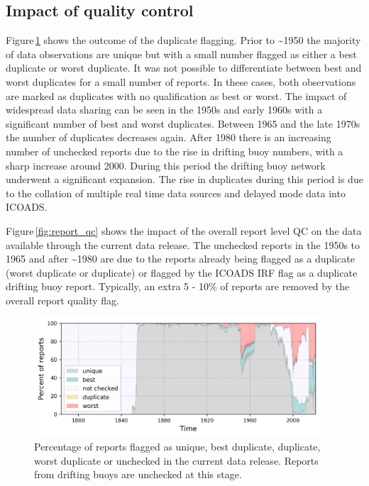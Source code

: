 \subsection{Impact of quality control}
Figure\,\ref{fig:dup_status} shows the outcome of the duplicate flagging. 
Prior to \sim 1950 the majority of data observations are unique but with a small number flagged as either a best duplicate or worst duplicate.
It was not possible to differentiate between best and worst duplicates for a small number of reports. 
In these cases, both observations are marked as duplicates with no qualification as best or worst.
The impact of widespread data sharing can be seen in the 1950s and early 1960s with a significant number of best and worst duplicates. 
Between 1965 and the late 1970s the number of duplicates decreases again.
After 1980 there is an increasing number of unchecked reports due to the rise in drifting buoy numbers, with a sharp increase around 2000.
During this period the drifting buoy network underwent a significant expansion.
The rise in duplicates during this period is due to the collation of multiple real time data sources and delayed mode data into ICOADS.

Figure\,\ref{fig:report_qc} shows the impact of the overall report level QC on the data available through the current data release. 
The unchecked reports in the 1950s to 1965 and after \sim 1980 are due to the reports already being flagged as a duplicate (worst duplicate or duplicate) or flagged by the ICOADS IRF flag as a duplicate drifting buoy report.
Typically, an extra 5 - 10\% of reports are removed by the overall report quality flag.

\FloatBarrier

\begin{figure}[htp]
    \includegraphics[width=0.95\textwidth]{resources/duplicate_status-ts.png}
    \caption{Percentage of reports flagged as unique, best duplicate, duplicate, worst duplicate or unchecked in the current data release. Reports from drifting buoys are unchecked at this stage.\\}
    \label{fig:dup_status}
\end{figure}

